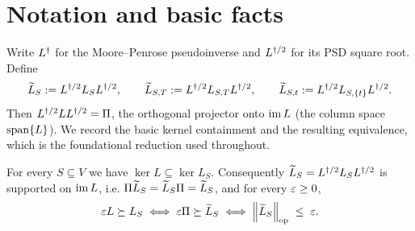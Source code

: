 \section*{Notation and basic facts}

Write $L^{\dagger}$ for the Moore--Penrose pseudoinverse and $L^{\dagger/2}$ for its PSD square
root. Define
\[
  \widetilde{L}_S      := L^{\dagger/2} L_S L^{\dagger/2}, \qquad
  \widetilde{L}_{S,T}  := L^{\dagger/2} L_{S,T}  L^{\dagger/2}, \qquad
  \widetilde{L}_{S,t}  := L^{\dagger/2} L_{S,\{t\}}L^{\dagger/2}.
\]
Then $L^{\dagger/2} L L^{\dagger/2} = \Pi$, the orthogonal projector onto $\operatorname{im} L$
(the column space $\operatorname{span}\{L\}$). We record the basic kernel containment and
the resulting equivalence, which is the foundational reduction used throughout.

\begin{qsixlemma}\label{lem:opnorm-form}
For every $S\subseteq V$ we have $\ker L\subseteq\ker L_S$. Consequently
$\widetilde{L}_S=L^{\dagger/2} L_SL^{\dagger/2}$ is supported on $\operatorname{im} L$, i.e.
$\Pi\widetilde{L}_S=\widetilde{L}_S\Pi=\widetilde{L}_S$, and for every $\varepsilon\ge 0$,
\begin{equation}\label{eq:opnorm-form}
  \varepsilon L\succeq L_S
  \;\Longleftrightarrow\;
  \varepsilon\Pi\succeq\widetilde{L}_S
  \;\Longleftrightarrow\;
  \left\lVert \widetilde{L}_S \right\rVert_{\mathrm{op}} \;\le\; \varepsilon.
\end{equation}
\end{qsixlemma}

